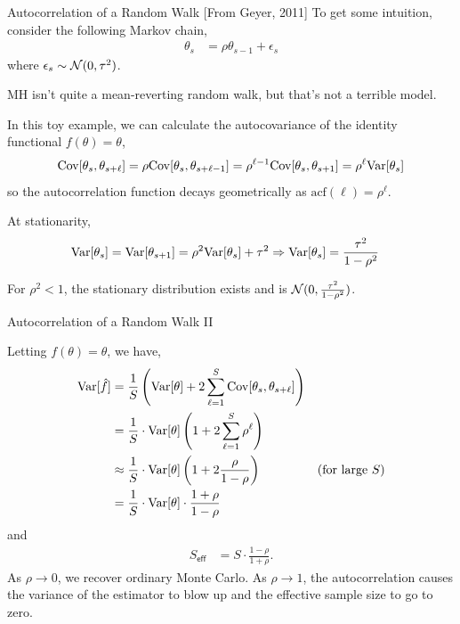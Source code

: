 \documentclass[aspectratio=169]{beamer}
\begin{document}
\begin{frame}{Autocorrelation of a Random Walk}
[From Geyer, 2011] To get some intuition, consider the following Markov chain,
\begin{align}
    \theta_s &= \rho \theta_{s-1} + \epsilon_s 
\end{align}
where $\epsilon_s \sim \mathcal{N}(0, \tau^2)$.

MH isn't quite a mean-reverting random walk, but that's not a terrible model. 

In this toy example, we can calculate the autocovariance of the identity functional $f(\theta) = \theta$,
\begin{align}
    \mathrm{Cov}[\theta_s, \theta_{s+\ell}] = 
    \rho \mathrm{Cov}[\theta_s, \theta_{s+\ell - 1}] = 
    \rho^{\ell - 1} \mathrm{Cov}[\theta_s, \theta_{s+1}] = 
    \rho^\ell \textrm{Var}[\theta_s]
\end{align}
so the autocorrelation function decays geometrically as $\mathrm{acf}(\ell) = \rho^\ell$.

At stationarity,
\begin{align}
    \textrm{Var}[\theta_s] &= \textrm{Var}[\theta_{s+1}] = \rho^2 \textrm{Var}[\theta_s] + \tau^2
    \Rightarrow \textrm{Var}[\theta_s] = \frac{\tau^2}{1 - \rho^2}
\end{align}

For $\rho^2 < 1$, the stationary distribution exists and is $\mathcal{N}(0, \tfrac{\tau^2}{1-\rho^2})$.

\end{frame}

\begin{frame}{Autocorrelation of a Random Walk II}

Letting $f(\theta) = \theta$, we have,
\begin{align}
 \textrm{Var}[\hat{f}] &= \frac{1}{S} \left( \textrm{Var}[\theta] + 2 \sum_{\ell=1}^S \mathrm{Cov}[\theta_s, \theta_{s+\ell}] \right) \\
 &= \frac{1}{S} \cdot \textrm{Var}[\theta] \left(1  + 2 \sum_{\ell=1}^S \rho^\ell \right) \\
 &\approx \frac{1}{S} \cdot \textrm{Var}[\theta] \left(1  + 2 \frac{\rho}{1 - \rho} \right) & \text{(for large $S$)}\\
 &= \frac{1}{S} \cdot \textrm{Var}[\theta] \cdot \frac{1 + \rho}{1 - \rho}
\end{align}
and 
\begin{align}
    S_{\mathsf{eff}} &= S \cdot \frac{1-\rho}{1+\rho}.
\end{align}
As $\rho \to 0$, we recover ordinary Monte Carlo. As $\rho \to 1$, the autocorrelation causes the variance of the estimator to blow up and the effective sample size to go to zero.

\end{frame}
\end{document}
